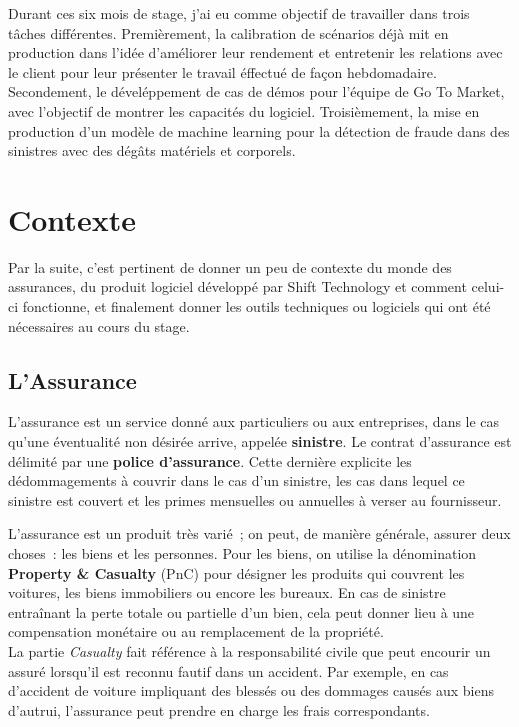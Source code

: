 \documentclass [twoside,openright,a4paper,11pt,french] {report}
\begin{document}
Durant ces six mois de stage, j'ai eu comme objectif de travailler dans trois tâches différentes. Premièrement, la calibration de 
scénarios déjà mit en production dans l'idée d'améliorer leur rendement et entretenir les relations avec le client pour leur présenter
le travail éffectué de façon hebdomadaire. Secondement, le déveléppement de cas de démos pour l'équipe de Go To Market, 
avec l'objectif de montrer les capacités du logiciel. Troisièmement, la mise en production d'un modèle de machine learning pour
la détection de fraude dans des sinistres avec des dégâts matériels et corporels.


\chapter {Contexte}
    \label {chap:plan}
Par la suite, c'est pertinent de donner un peu 
de contexte du monde des assurances, du produit logiciel développé par Shift Technology et comment
celui-ci fonctionne, et finalement donner les outils techniques ou logiciels qui ont été
nécessaires au cours du stage. 
\section{L'Assurance}

L'assurance est un service donné aux particuliers ou aux entreprises, dans le 
cas qu'une éventualité non désirée arrive, appelée \textbf{sinistre}. Le 
contrat d'assurance est délimité par une \textbf{police d'assurance}. Cette dernière
explicite les dédommagements à couvrir dans le cas d'un sinistre, les cas dans lequel ce 
sinistre est couvert et les primes mensuelles ou annuelles à verser au fournisseur. 

L'assurance est un produit très varié~; on peut, de manière générale, assurer deux choses~:
les biens et les personnes. Pour les biens, on utilise la dénomination \textbf{Property \& Casualty} (PnC) 
pour désigner les produits qui couvrent les voitures, les biens immobiliers ou encore les bureaux. 
En cas de sinistre entraînant la perte totale ou partielle d'un bien, cela peut donner lieu à une 
compensation monétaire ou au remplacement de la propriété.\\

La partie \emph{Casualty} fait référence à la responsabilité civile que peut encourir un assuré lorsqu'il
est reconnu fautif dans un accident. Par exemple, en cas d'accident de voiture impliquant des blessés ou 
des dommages causés aux biens d'autrui, l'assurance peut prendre en charge les frais correspondants.
 
\end{document}
